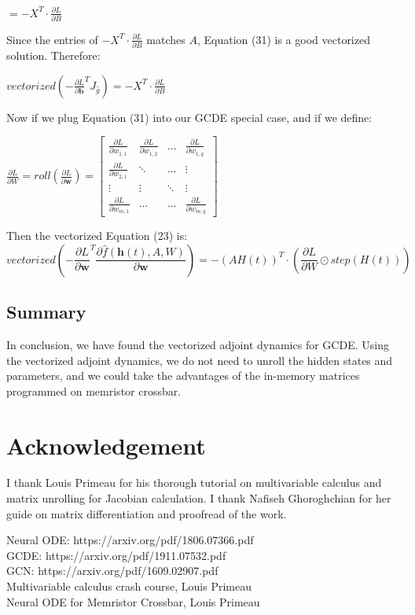\documentclass{article}
\begin{document}
\begin{center}
    $ = -X^T \cdot \frac{\partial L}{\partial B}$
\end{center}
Since the entries of $-X^T\cdot \frac{\partial L}{\partial B}$ matches $A$, Equation (31) is a good vectorized solution. Therefore:
\begin{center}
    $vectorized(-\frac{\partial L}{\partial \mathbf{b}}^{T}  J_{\widehat{g}}) = -X^T\cdot \frac{\partial L}{\partial B}$
\end{center}
Now if we plug Equation (31) into our GCDE special case, and if we define:
\begin{center}
    $\frac{\partial L}{\partial W} = roll(\frac{\partial L}{\partial \mathbf{w}})=\begin{bmatrix}
        \frac{\partial L}{\partial w_{1,1}} & \frac{\partial L}{\partial w_{1,2}} & \hdots &\frac{\partial L}{\partial w_{1,q} } \\
        \frac{\partial L}{\partial w_{2,1}} & \ddots & \hdots &\vdots \\
        \vdots & \vdots & \ddots & \vdots\\
        \frac{\partial L}{\partial w_{m,1}} & \hdots & \hdots &\frac{\partial L}{\partial w_{m,q}}
    \end{bmatrix}$
\end{center}
Then the vectorized Equation (23) is:
\begin{equation}
 vectorized(-\frac{\partial L}{\partial \mathbf{w}}^{T}  \frac{\partial \widehat{f}(\mathbf{h}(t), A, W)}{\partial \mathbf{w}}) = 
    -(AH(t))^T \cdot (\frac{\partial L}{\partial W} \odot step(H(t)))
\end{equation}
\subsection{Summary}
In conclusion, we have found the vectorized adjoint dynamics for GCDE. Using the vectorized adjoint dynamics, we do not need to unroll the hidden states and parameters, and we could take the advantages of the in-memory matrices programmed on memristor crossbar.
\section*{Acknowledgement}
I thank Louis Primeau for his thorough tutorial on multivariable calculus and matrix unrolling for Jacobian calculation. I thank Nafiseh Ghoroghchian for her guide on matrix differentiation and proofread of the work.


Neural ODE: https://arxiv.org/pdf/1806.07366.pdf \\
GCDE: https://arxiv.org/pdf/1911.07532.pdf \\
GCN: https://arxiv.org/pdf/1609.02907.pdf \\
Multivariable calculus crash course, Louis Primeau \\
Neural ODE for Memristor Crossbar, Louis Primeau
\end{document}
